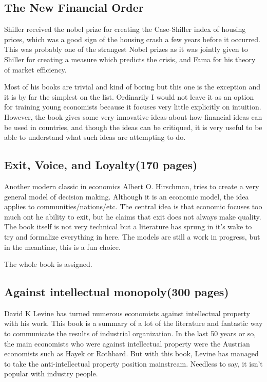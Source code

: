 \documentclass[12pt]{report}
\numberwithin{equation}{section}
\begin{document}
\subsection*{The New Financial Order}

Shiller received the nobel prize for creating the Case-Shiller index of housing prices, which was a good sign of the housing crash a few years before it occurred. This was probably one of the strangest Nobel prizes as it was jointly given to Shiller for creating a measure which predicts the crisis, and Fama for his theory of market efficiency. 

Most of his books are trivial and kind of boring but this one is the exception and it is by far the simplest on the list. Ordinarily I would not leave it as an option for training young economists because it focuses very little explicitly on intuition. However, the book gives some very innovative ideas about how financial ideas can be used in countries, and though the ideas can be critiqued, it is very useful to be able to understand what such ideas are attempting to do. 

\subsection*{Exit, Voice, and Loyalty(170 pages)}

Another modern classic in economics Albert O. Hirschman, tries to create a very general model of decision making. Although it is an economic model, the idea applies to communities/nations/etc. The central idea is that economic focuses too much ont he ability to exit, but he claims that exit does not always make quality. The book itself is not very technical but a literature has sprung in it's wake to try and formalize everything in here. The models are still a work in progress, but in the meantime, this is a fun choice. 

The whole book is assigned.

\newpage
\subsection*{Against intellectual monopoly(300 pages)}

David K Levine has turned numerous economists against intellectual property with his work. This book is a summary of a lot of the literature and fantastic way to communicate the results of industrial organization. In the last 50 years or so, the main economists who were against intellectual property were the Austrian economists such as Hayek or Rothbard. But with this book, Levine has managed to take the anti-intellectual property position mainstream. Needless to say, it isn't popular with industry people. 
\end{document}
